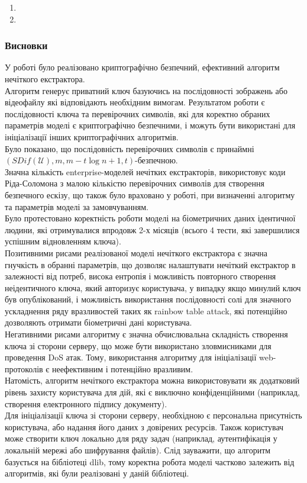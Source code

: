 \documentclass[11pt]{article}
\begin{document}
\begin{enumerate}
\def\labelenumi{\arabic{enumi}.}
\item
\item
\end{enumerate}

    \hypertarget{ux432ux438ux441ux43dux43eux432ux43aux438}{%
\subsubsection{Висновки}\label{ux432ux438ux441ux43dux43eux432ux43aux438}}

У роботі було реалізовано криптографічно безпечний, ефективний алгоритм
нечіткого екстрактора.\\
Алгоритм генерує приватний ключ базуючись на послідовності зображень або
відеофайлу які відповідають необхідним вимогам. Результатом роботи є
послідовності ключа та перевірочних символів, які для коректно обраних
параметрів моделі є криптографічно безпечними, і можуть бути використані
для ініціалізації інших криптографічних алгоритмів.\\
Було показано, що послідовність перевірочних символів є принаймні
\((SDif(\mathscr{U}),m,m-t\log{n+1},t)\)-безпечною.\\
Значна кількість enterprise-моделей нечітких екстракторів, використовує
коди Ріда-Соломона з малою кількістю перевірочних символів для створення
безпечного ескізу, що також було враховано у роботі, при визначенні
алгоритму та параметрів моделі за замовчуванням.\\
Було протестовано коректність роботи моделі на біометричних даних
ідентичної людини, які отримувалися впродовж 2-х місяців (всього 4
тести, які завершилися успішним відновленням ключа).\\
Позитивними рисами реалізованої моделі нечіткого екстрактора є значна
гнучкість в обранні параметрів, що дозволяє налаштувати нечіткий
екстрактор в залежності від потреб, висока ентропія і можливість
повторного створення неідентичного ключа, який авторизує користувача, у
випадку якщо минулий ключ був опублікований, і можливість використання
послідовності солі для значного ускладнення ряду вразливостей таких як
rainbow table attack, які потенційно дозволяють отримати біометричні
дані користувача.\\
Негативними рисами алгоритму є значна обчислювальна складність створення
ключа зі сторони серверу, що може бути використано зловмисниками для
проведення DoS атак. Тому, використання алгоритму для ініціалізації
web-протоколів є неефективним і потенційно вразливим.\\
Натомість, алгоритм нечіткого екстрактора можна використовувати як
додатковий рівень захисту користувача для дій, які є виключно
конфіденційними (наприклад, створення електронного підпису документу).\\
Для ініціалізації ключа зі сторони серверу, необхідною є персональна
присутність користувача, або надання його даних з довірених ресурсів.
Також користувач може створити ключ локально для ряду задач (наприклад,
аутентифікація у локальній мережі або шифрування файлів). Слід
зауважити, що алгоритм базується на бібліотеці dlib, тому коректна
робота моделі частково залежить від алгоритмів, які були реалізовані у
даній бібліотеці.
\end{document}
